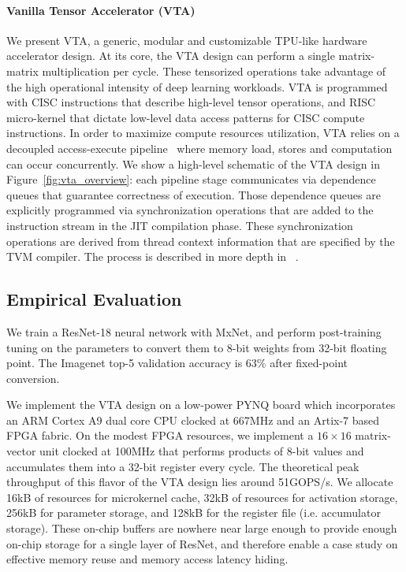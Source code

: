 \documentclass[sigconf]{acmart}
\begin{document}
\paragraph{Vanilla Tensor Accelerator (VTA)}
We present VTA, a generic, modular and customizable TPU-like hardware accelerator design.
At its core, the VTA design can perform a single matrix-matrix multiplication per cycle.
These tensorized operations take advantage of the high operational intensity of deep learning workloads.
VTA is programmed with CISC instructions that describe high-level tensor operations, and RISC micro-kernel that dictate low-level data access patterns for CISC compute instructions.
In order to maximize compute resources utilization, VTA relies on a decoupled access-execute pipeline~\cite{Smith:DAE} where memory load, stores and computation can occur concurrently.
We show a high-level schematic of the VTA design in Figure~\ref{fig:vta_overview}: each pipeline stage communicates via dependence queues that guarantee correctness of execution.
Those dependence queues are explicitly programmed via synchronization operations that are added to the instruction stream in the JIT compilation phase.
These synchronization operations are derived from thread context information that are specified by the TVM compiler.
The process is described in more depth in ~\cite{chen:TVM}.

\subsection{Empirical Evaluation}

We train a ResNet-18 neural network with MxNet, and perform post-training tuning on the parameters to convert them to 8-bit weights from 32-bit floating point.
The Imagenet top-5 validation accuracy is 63\% after fixed-point conversion.

We implement the VTA design on a low-power PYNQ board which incorporates an ARM Cortex A9 dual core CPU clocked at 667MHz and an Artix-7 based FPGA fabric.
On the modest FPGA resources, we implement a $16\times16$ matrix-vector unit clocked at 100MHz that performs products of 8-bit values and accumulates them into a 32-bit register every cycle.
The theoretical peak throughput of this flavor of the VTA design lies around 51GOPS/s.
We allocate 16kB of resources for microkernel cache, 32kB of resources for activation storage, 256kB for parameter storage, and 128kB for the register file (i.e. accumulator storage).
These on-chip buffers are nowhere near large enough to provide enough on-chip storage for a single layer of ResNet, and therefore enable a case study on effective memory reuse and memory access latency hiding.
\end{document}
